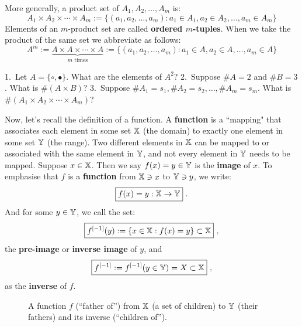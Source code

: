 More generally, a product set of $A_1,A_2,\ldots,A_m$ is:
\[
\boxed{
A_1 \times A_2 \times \cdots \times A_m := \{(a_1,a_2,\ldots,a_{m}): a_1 \in A_1, a_2 \in A_2, \ldots, a_{m} \in A_m \}
}
\]
Elements of an $m$-product set are called {\bf ordered $m$-tuples}.  When we take the product of the same set we abbreviate as follows:
\[
\boxed{
A^m := \underset{m \text{ times}}{\underbrace{A \times A \times \cdots \times A}} := \{(a_1,a_2,\ldots,a_m): a_1 \in A, a_2 \in A, \ldots, a_{m} \in A \}
}
\]
\begin{classwork}
1.~Let $A=\{\circ, \bullet \}$.  What are the elements of $A^2$?  2.~Suppose $\# A = 2$ and $\# B = 3$.  What is $\# (A \times B)$?  3.~Suppose $\# A_1 = s_1, \# A_2 = s_2, \ldots, \# A_m = s_m$.  What is $\# (A_1 \times A_2 \times \cdots \times A_m)$?
\vspace{4cm}
\end{classwork}

Now, let's recall the definition of a function.  A {\bf function} is a ``mapping" that associates each element in some set $\mathbb{X}$ (the domain) to exactly one element in some set $\mathbb{Y}$ (the range). Two different elements in $\mathbb{X}$ can be mapped to or associated with the same element in $\mathbb{Y}$, and not every element in $\mathbb{Y}$ needs to be mapped.  Suppose $x \in \mathbb{X}$. Then we say ${f(x)=y \in \mathbb{Y}}$ is the {\bf image} of $x$.  To emphasise that $f$ is a {\bf function} from $\mathbb{X} \ni x$ to $\mathbb{Y} \ni y$, we write:
$$\boxed{f(x)=y:\mathbb{X} \to \mathbb{Y}} \ .$$
And for some $y \in \mathbb{Y}$, we call the set:
$$\boxed{f^{[-1]}(y) := \{x \in \mathbb{X} : f(x)=y \} \subset \mathbb{X}} \ ,$$
the {\bf pre-image} or {\bf inverse image} of $y$, and
$$\boxed{f^{[-1]} := f^{[-1]}(y \in \mathbb{Y}) = X \subset \mathbb{X}} \ ,$$
as the {\bf inverse} of $f$.

\begin{figure}[htpb]
\caption{A function $f$ (``father of'') from $\mathbb{X}$ (a set of children) to $\mathbb{Y}$ (their fathers) and its inverse (``children of'').\label{F:function}}
\vspace{4cm}
\end{figure}

